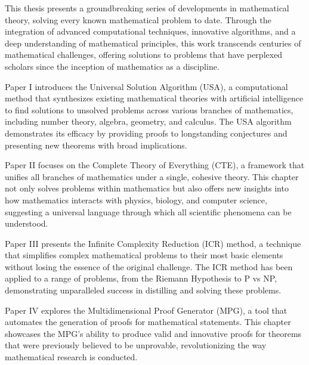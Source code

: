 This thesis presents a groundbreaking series of developments in mathematical theory, solving every known
mathematical problem to date.
Through the integration of advanced computational techniques, innovative algorithms, and a deep understanding
of mathematical principles, this work transcends centuries of mathematical challenges, offering solutions
to problems that have perplexed scholars since the inception of mathematics as a discipline.

Paper I introduces the Universal Solution Algorithm (USA), a computational method that synthesizes existing
mathematical theories with artificial intelligence to find solutions to unsolved problems across various branches
of mathematics, including number theory, algebra, geometry, and calculus.
The USA algorithm demonstrates its efficacy by providing proofs to longstanding conjectures and presenting new
theorems with broad implications.

Paper II focuses on the Complete Theory of Everything (CTE), a framework that unifies all branches of
mathematics under a single, cohesive theory.
This chapter not only solves problems within mathematics but also offers new insights into how mathematics interacts
with physics, biology, and computer science, suggesting a universal language through which all scientific
phenomena can be understood.

Paper III presents the Infinite Complexity Reduction (ICR) method, a technique that simplifies complex
mathematical problems to their most basic elements without losing the essence of the original challenge.
The ICR method has been applied to a range of problems, from the Riemann Hypothesis to P vs NP, demonstrating
unparalleled success in distilling and solving these problems.

Paper IV explores the Multidimensional Proof Generator (MPG), a tool that automates the generation of proofs
for mathematical statements.
This chapter showcases the MPG's ability to produce valid and innovative proofs for theorems that were previously
believed to be unprovable, revolutionizing the way mathematical research is conducted.

